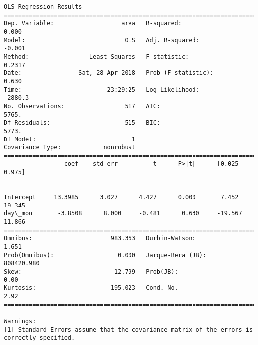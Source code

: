 \documentclass[11pt]{article}
\begin{document}
\begin{Verbatim}[commandchars=\\\{\}]
                            OLS Regression Results                            
==============================================================================
Dep. Variable:                   area   R-squared:                       0.000
Model:                            OLS   Adj. R-squared:                 -0.001
Method:                 Least Squares   F-statistic:                    0.2317
Date:                Sat, 28 Apr 2018   Prob (F-statistic):              0.630
Time:                        23:29:25   Log-Likelihood:                -2880.3
No. Observations:                 517   AIC:                             5765.
Df Residuals:                     515   BIC:                             5773.
Df Model:                           1                                         
Covariance Type:            nonrobust                                         
==============================================================================
                 coef    std err          t      P>|t|      [0.025      0.975]
------------------------------------------------------------------------------
Intercept     13.3985      3.027      4.427      0.000       7.452      19.345
day\_mon       -3.8508      8.000     -0.481      0.630     -19.567      11.866
==============================================================================
Omnibus:                      983.363   Durbin-Watson:                   1.651
Prob(Omnibus):                  0.000   Jarque-Bera (JB):           808420.980
Skew:                          12.799   Prob(JB):                         0.00
Kurtosis:                     195.023   Cond. No.                         2.92
==============================================================================

Warnings:
[1] Standard Errors assume that the covariance matrix of the errors is correctly specified.



\end{Verbatim}
\end{document}
